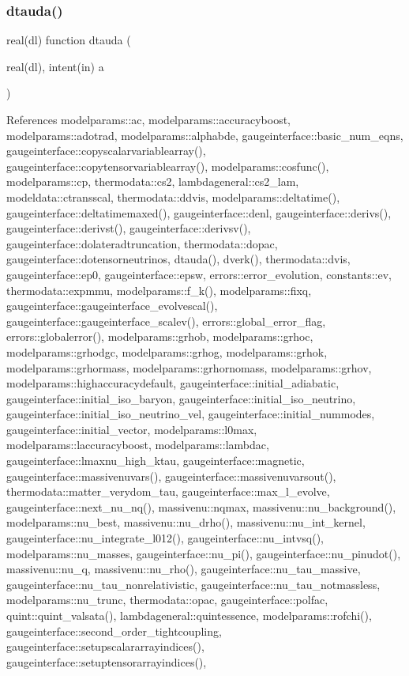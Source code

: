\subsubsection{\texorpdfstring{dtauda()}{dtauda()}}
{\footnotesize\ttfamily real(dl) function dtauda (\begin{DoxyParamCaption}\item[{real(dl), intent(in)}]{a }\end{DoxyParamCaption})}



References modelparams\+::ac, modelparams\+::accuracyboost, modelparams\+::adotrad, modelparams\+::alphabde, gaugeinterface\+::basic\+\_\+num\+\_\+eqns, gaugeinterface\+::copyscalarvariablearray(), gaugeinterface\+::copytensorvariablearray(), modelparams\+::cosfunc(), modelparams\+::cp, thermodata\+::cs2, lambdageneral\+::cs2\+\_\+lam, modeldata\+::ctransscal, thermodata\+::ddvis, modelparams\+::deltatime(), gaugeinterface\+::deltatimemaxed(), gaugeinterface\+::denl, gaugeinterface\+::derivs(), gaugeinterface\+::derivst(), gaugeinterface\+::derivsv(), gaugeinterface\+::dolateradtruncation, thermodata\+::dopac, gaugeinterface\+::dotensorneutrinos, dtauda(), dverk(), thermodata\+::dvis, gaugeinterface\+::ep0, gaugeinterface\+::epsw, errors\+::error\+\_\+evolution, constants\+::ev, thermodata\+::expmmu, modelparams\+::f\+\_\+k(), modelparams\+::fixq, gaugeinterface\+::gaugeinterface\+\_\+evolvescal(), gaugeinterface\+::gaugeinterface\+\_\+scalev(), errors\+::global\+\_\+error\+\_\+flag, errors\+::globalerror(), modelparams\+::grhob, modelparams\+::grhoc, modelparams\+::grhodgc, modelparams\+::grhog, modelparams\+::grhok, modelparams\+::grhormass, modelparams\+::grhornomass, modelparams\+::grhov, modelparams\+::highaccuracydefault, gaugeinterface\+::initial\+\_\+adiabatic, gaugeinterface\+::initial\+\_\+iso\+\_\+baryon, gaugeinterface\+::initial\+\_\+iso\+\_\+neutrino, gaugeinterface\+::initial\+\_\+iso\+\_\+neutrino\+\_\+vel, gaugeinterface\+::initial\+\_\+nummodes, gaugeinterface\+::initial\+\_\+vector, modelparams\+::l0max, modelparams\+::laccuracyboost, modelparams\+::lambdac, gaugeinterface\+::lmaxnu\+\_\+high\+\_\+ktau, gaugeinterface\+::magnetic, gaugeinterface\+::massivenuvars(), gaugeinterface\+::massivenuvarsout(), thermodata\+::matter\+\_\+verydom\+\_\+tau, gaugeinterface\+::max\+\_\+l\+\_\+evolve, gaugeinterface\+::next\+\_\+nu\+\_\+nq(), massivenu\+::nqmax, massivenu\+::nu\+\_\+background(), modelparams\+::nu\+\_\+best, massivenu\+::nu\+\_\+drho(), massivenu\+::nu\+\_\+int\+\_\+kernel, gaugeinterface\+::nu\+\_\+integrate\+\_\+l012(), gaugeinterface\+::nu\+\_\+intvsq(), modelparams\+::nu\+\_\+masses, gaugeinterface\+::nu\+\_\+pi(), gaugeinterface\+::nu\+\_\+pinudot(), massivenu\+::nu\+\_\+q, massivenu\+::nu\+\_\+rho(), gaugeinterface\+::nu\+\_\+tau\+\_\+massive, gaugeinterface\+::nu\+\_\+tau\+\_\+nonrelativistic, gaugeinterface\+::nu\+\_\+tau\+\_\+notmassless, modelparams\+::nu\+\_\+trunc, thermodata\+::opac, gaugeinterface\+::polfac, quint\+::quint\+\_\+valsata(), lambdageneral\+::quintessence, modelparams\+::rofchi(), gaugeinterface\+::second\+\_\+order\+\_\+tightcoupling, gaugeinterface\+::setupscalararrayindices(), gaugeinterface\+::setuptensorarrayindices(), 